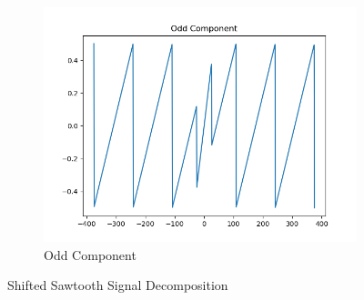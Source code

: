 \documentclass[10pt,a4paper, margin=1in]{article}
\begin{document}
\begin{enumerate}
\begin{enumerate}
\begin{figure}[h]
\begin{subfigure}[t]{0.3\linewidth}
        \caption{Odd Component}
        \includegraphics[width=1\linewidth]{assets/q7a/shifted_sawtooth_part_a_odd.png}
    \end{subfigure}
    \caption{Shifted Sawtooth Signal Decomposition}
\end{figure}


\end{enumerate}
\end{enumerate}
\end{document}
